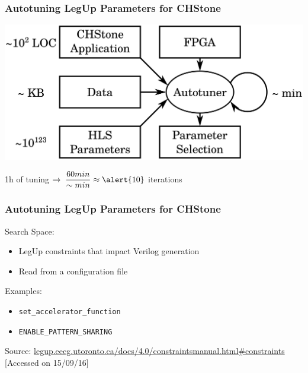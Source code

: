 \documentclass[10pt, compress, aspectratio=169]{beamer}
\begin{document}
\begin{frame}
    \frametitle{Autotuning LegUp Parameters for CHStone}
    \begin{center}
        \includegraphics[width=.73\textwidth]{overview_fpgas_small}

         \alert{1h} of tuning $\rightarrow \; \dfrac{60min}{\sim{}min} \approx \alert{10}$ \alert{iterations}
    \end{center}
\end{frame}

\begin{frame}
    \frametitle{Autotuning LegUp Parameters for CHStone}
    \alert{Search Space}:
    \begin{itemize}
        \item \alert{LegUp constraints} that impact \alert{Verilog generation}
        \item Read from a \alert{configuration file}
    \end{itemize}

    Examples:
    \begin{itemize}
        \item \texttt{set\_accelerator\_function}
        \item \texttt{ENABLE\_PATTERN\_SHARING}
    \end{itemize}

    \begin{center}
        \tiny{Source: \url{legup.eecg.utoronto.ca/docs/4.0/constraintsmanual.html\#constraints} [Accessed on 15/09/16]}
    \end{center}
\end{frame}
\end{document}
